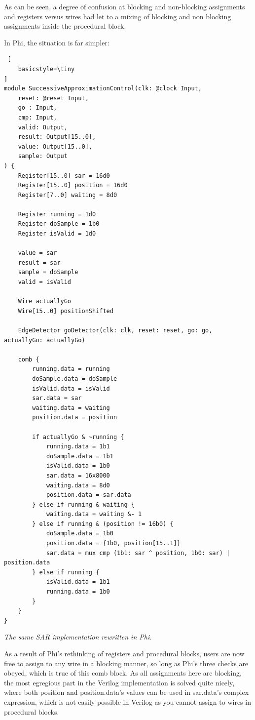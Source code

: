 \documentclass[10pt, two column]{article}
\theoremstyle{definition}
\begin{document}
As can be seen, a degree of confusion at blocking and non-blocking assignments and registers versus wires had let to a mixing of blocking and non blocking assignments inside the procedural block.

In Phi, the situation is far simpler:

\begin{lstlisting} [
    basicstyle=\tiny
]
module SuccessiveApproximationControl(clk: @clock Input,
    reset: @reset Input,
    go : Input,
    cmp: Input,
    valid: Output,
    result: Output[15..0],
    value: Output[15..0],
    sample: Output
) {
    Register[15..0] sar = 16d0
    Register[15..0] position = 16d0
    Register[7..0] waiting = 8d0

    Register running = 1d0
    Register doSample = 1b0
    Register isValid = 1d0

    value = sar
    result = sar
    sample = doSample
    valid = isValid

    Wire actuallyGo
    Wire[15..0] positionShifted

    EdgeDetector goDetector(clk: clk, reset: reset, go: go, actuallyGo: actuallyGo)

    comb {
        running.data = running
        doSample.data = doSample
        isValid.data = isValid
        sar.data = sar
        waiting.data = waiting
        position.data = position

        if actuallyGo & ~running {
            running.data = 1b1
            doSample.data = 1b1
            isValid.data = 1b0
            sar.data = 16x8000
            waiting.data = 8d0
            position.data = sar.data
        } else if running & waiting {
            waiting.data = waiting &- 1
        } else if running & (position != 16b0) {
            doSample.data = 1b0
            position.data = {1b0, position[15..1]}
            sar.data = mux cmp (1b1: sar ^ position, 1b0: sar) | position.data
        } else if running {
            isValid.data = 1b1
            running.data = 1b0
        }
    }
}
\end{lstlisting}
\begin{center}
\textit{The same SAR implementation rewritten in Phi.}
\end{center}

As a result of Phi's rethinking of registers and procedural blocks, users are now free to assign to any wire in a blocking manner, so long as Phi's three checks are obeyed, which is true of this comb block. As all assignments here are blocking, the most egregious part in the Verilog implementation is solved quite nicely, where both position and position.data's values can be used in sar.data's complex expression, which is not easily possible in Verilog as you cannot assign to wires in procedural blocks.
\end{document}
